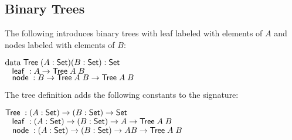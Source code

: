 \subsection{Binary Trees}
The following introduces binary trees with leaf labeled with elements of $A$ and nodes labeled with elements of $B$:
\begin{bsp}
$\data \Tree ( A : \Set ) ( B : \Set ) : \Set $ \\
$ \spc \leaf : A \ra \Tree A \; B $\\
$ \spc \node : B \ra \Tree A \; B \ra \Tree A \; B $
\end{bsp}
The tree definition adds the following constants to the signature:
\begin{bsp}
$\Tree  : ( A : \Set ) \ra ( B : \Set ) \ra \Set$ \\
$ \spc \leaf : ( A : \Set ) \ra ( B : \Set ) \ra A \ra \Tree A \; B $ \\
$ \spc \node : ( A : \Set ) \ra ( B : \Set ) \ra A B \ra \Tree A \; B $
\end{bsp}
